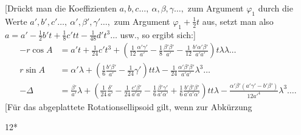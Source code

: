 [Drückt man die Koeffizienten \(a,b,c\ldots,\ \alpha,\beta,\gamma\ldots,\) zum Argument
\(\varphi_1\) durch die Werte \(a',b',c'\ldots,\ \alpha',\beta',\gamma'\ldots,\) zum Argument
\(\varphi_1+\tfrac12t\) aus, setzt man also
\(a=a'-\tfrac12b't+\tfrac18c'tt-\tfrac1{48}d't^3\ldots\)
usw., so ergibt sich:]
\[
\begin{aligned}
-r\cos A&=a't+\tfrac1{24}c't^3+
\left(\tfrac1{12}\frac{\alpha'\gamma'}{a'}-\tfrac18\frac{\beta'\beta'}{a'}-\tfrac1{12}\frac{b'\alpha'\beta'}{a'a'}\right)t\lambda\lambda\ldots\\[1ex]
r\sin A&=\alpha'\lambda+
\left(\tfrac16\frac{b'\beta'}{a'}-\tfrac1{24}\gamma'\right)tt\lambda
-\tfrac1{24}\frac{\alpha'\beta'\beta'}{a'a'}\lambda^3\ldots\\[1ex]
-\Delta&=\frac{\beta'}{a'}\lambda+
\left(\tfrac1{24}\frac{\delta'}{a'}-\tfrac1{24}\frac{c'\beta'}{a'a'}-\tfrac16\frac{\beta'\gamma'}{a'\alpha'}
+\tfrac16\frac{b'\beta'\beta'}{a'a'\alpha'}\right)tt\lambda
-\frac{\alpha'\beta'(a'\gamma'-b'\beta')}{12{a'}^4}\lambda^3\ldots.
\end{aligned}
\]
[Für das abgeplattete Rotationsellipsoid gilt, wenn zur Abkürzung
\par\vfill\hfill12*\par
\endgroup
\endgroup
